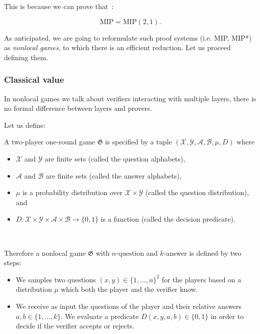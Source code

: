This is because we can prove that~\cite{mipre}:
\begin{theorem}
    \begin{equation}
    \text{MIP}=\text{MIP}(2,1).
    \end{equation}
\end{theorem}

As anticipated, we are going to reformulate such proof systems (i.e. MIP, MIP*) as \emph{nonlocal games}, to which there is an efficient reduction. Let us proceed defining them.
\subsubsection{Classical value}

In nonlocal games we talk about verifiers interacting with multiple layers, there is no formal difference between layers and provers.

Let us define: 

\begin{defn} A two-player one-round game $\mathfrak{G}$ is specified by a tuple $(\mathcal{X}, \mathcal{Y}, \mathcal{A}, \mathcal{B}, \mu, D)$ where
    \begin{itemize}
        \item $\mathcal{X}$ and $\mathcal{Y}$ are finite sets (called the question alphabets),
        \item $\mathcal{A}$ and $\mathcal{B}$ are finite sets (called the answer alphabets),
        \item $\mu$ is a probability distribution over $\mathcal{X} \times \mathcal{Y}$ (called the question distribution), and
        \item $D: \mathcal{X} \times \mathcal{Y} \times \mathcal{A} \times \mathcal{B} \rightarrow\{0,1\}$ is a function (called the decision predicate).
    \end{itemize}~\cite{mipre}
\end{defn}

Therefore a nonlocal game $\mathfrak{G}$ with $n$-question and $k$-answer is defined by two steps: 
\begin{itemize}
\item We samples two questions $(x, y) \in\{1, \ldots, n\}^{2}$ for the players based on a distribution $\mu$ which both the player and the verifier know.
\item We receive as input the questions of the player and their relative answers $a, b \in\{1, \ldots, k\}$. We evaluate a predicate $D(x, y, a, b) \in\{0,1\}$ in order to decide if the verifier accepts or rejects.
\end{itemize}

